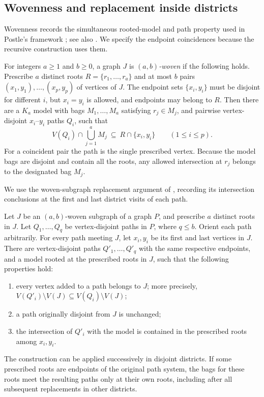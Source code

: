 \subsection{Wovenness and replacement inside districts}

Wovenness records the simultaneous rooted-model and path property used in
Postle's framework \cite[Section~3.3]{Postle2020}; see also
\cite[Definition~5.12]{DelcourtPostle2021}. We specify the endpoint
coincidences because the recursive construction uses them.

\begin{definition}\label{def:woven}
For integers $a\ge1$ and $b\ge0$, a graph $J$ is \emph{$(a,b)$-woven}
if the following holds.  Prescribe $a$ distinct roots
$R=\{r_1,\ldots,r_a\}$ and at most $b$ pairs
$(x_1,y_1),\ldots,(x_p,y_p)$ of vertices of $J$.  The endpoint sets
$\{x_i,y_i\}$ must be disjoint for different $i$, but $x_i=y_i$ is
allowed, and endpoints may belong to $R$.  Then there are a $K_a$ model
with bags $M_1,\ldots,M_a$ satisfying $r_j\in M_j$, and pairwise
vertex-disjoint $x_i$--$y_i$ paths $Q_i$, such that
\[
 V(Q_i)\cap\bigcup_{j=1}^a M_j
 \ \subseteq\ R\cap\{x_i,y_i\}\qquad(1\le i\le p).
\]
For a coincident pair the path is the single prescribed vertex.
Because the model bags are disjoint and contain all the roots, any
allowed intersection at $r_j$ belongs to the designated bag $M_j$.
\end{definition}

We use the woven-subgraph replacement argument of
\cite[Lemma~5.15]{DelcourtPostle2021}, recording its intersection
conclusions at the first and last district visits of each path.

\begin{lemma}\label{lem:rerouting}
Let $J$ be an $(a,b)$-woven subgraph of a graph $P$, and prescribe $a$
distinct roots in $J$.  Let $Q_1,\ldots,Q_q$ be vertex-disjoint paths in $P$,
where $q\le b$.  Orient each path arbitrarily.  For every path meeting
$J$, let $x_i,y_i$ be its first and last vertices in $J$.
There are vertex-disjoint paths $Q'_1,\ldots,Q'_q$ with the same
respective endpoints, and a model rooted at the prescribed roots in $J$,
such that the following properties hold:
\begin{enumerate}[label=(\roman*)]
\item every vertex added to a path belongs to $J$; more precisely,
      $V(Q'_i)\setminus V(J)\subseteq V(Q_i)\setminus V(J)$;
\item a path originally disjoint from $J$ is unchanged;
\item the intersection of $Q'_i$ with the model is contained in the
      prescribed roots among $x_i,y_i$.
\end{enumerate}
The construction can be applied successively in disjoint districts.
If some prescribed roots are endpoints of the original path system,
the bags for these roots meet the resulting paths only at their own
roots, including after all subsequent replacements in other districts.
\end{lemma}

